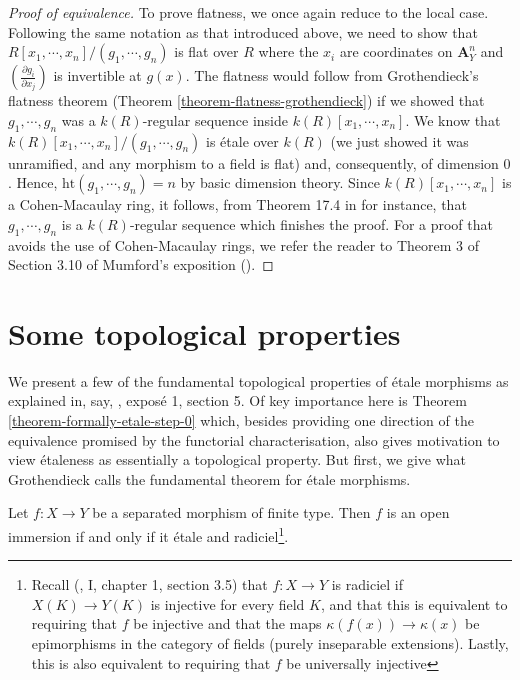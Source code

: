 \begin{proof}[Proof of equivalence]
\medskip\noindent
To prove flatness, we once again reduce to the local case. Following the
same notation as that introduced above, we need to show that
$R[x_1,\cdots,x_n]/(g_1,\cdots,g_n)$ is flat over $R$ where the $x_i$ are
coordinates on $\mathbf{A}^n_Y$ and $(\frac{\partial g_i}{\partial x_j})$ is
invertible at $g(x)$. The flatness would follow from Grothendieck's flatness
theorem (Theorem \ref{theorem-flatness-grothendieck}) if we showed that
$g_1,\cdots,g_n$ was a $k(R)$-regular sequence inside
$k(R)[x_1,\cdots,x_n]$. We know that $k(R)[x_1,\cdots,x_n]/(g_1,\cdots,g_n)$
is \'etale over $k(R)$ (we just showed it was unramified, and any morphism to
a field is flat) and, consequently, of dimension $0$. Hence,
$\mathrm{ht}(g_1,\cdots,g_n) = n$ by basic dimension theory. Since
$k(R)[x_1,\cdots,x_n]$ is a Cohen-Macaulay ring, it follows, from Theorem
17.4 in \cite{Ma} for instance, that $g_1,\cdots,g_n$ is a $k(R)$-regular
sequence which finishes the proof. For a proof that avoids the use of
Cohen-Macaulay rings, we refer the reader to Theorem 3 of Section 3.10 of
Mumford's exposition (\cite{RB}).
\end{proof}

\section{Some topological properties }
\label{section-topological-etale}

\noindent
We present a few of the fundamental topological properties of \'etale
morphisms as explained in, say, \cite{SGA1}, expos\'e 1, section 5. Of key
importance here is Theorem \ref{theorem-formally-etale-step-0} which, besides
providing one direction of the equivalence promised by the functorial
characterisation, also gives motivation to view \'etaleness as essentially
a topological property. But first, we give what Grothendieck calls the
fundamental theorem for \'etale morphisms.

\begin{theorem}
\label{theorem-etale-radiciel-open}
Let $f:X \to Y$ be a separated morphism of finite type. Then $f$ is an open
immersion if and only if it \'etale and
radiciel\footnote{Recall (\cite{EGA}, I, chapter 1, section 3.5) that
$f:X \to Y$ is radiciel if $X(K) \to Y(K)$ is injective for every field $K$,
and that this is equivalent to requiring that $f$ be injective and that the
maps $\kappa(f(x)) \to \kappa(x)$ be epimorphisms in the category of fields
(purely inseparable extensions). Lastly, this is also equivalent to requiring
that $f$ be universally injective}.
\end{theorem}

